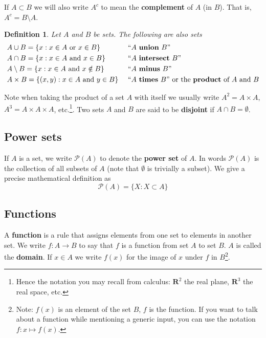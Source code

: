 \documentclass[12pt]{article}
\numberwithin{equation}{subsection}
\newtheorem{defn}[subsection]{Definition}
\theoremstyle{note}
\begin{document}
If $A\subset B$ we will also write $A^{c}$ to mean the \textbf{complement} of $A$ (in $B$). That is, $A^{c}=B\setminus A$.


\begin{defn}
Let $A$ and $B$ be sets. The following are also sets
\begin{align*}
	& A \cup B = \{ x : x\in A \text{ or } x\in B\} &&\text{ ``$A$ \textbf{union} $B$'' }\\
	& A \cap B = \{ x : x\in A \text{ and } x\in B\} &&\text{ ``$A$ \textbf{intersect} $B$'' }\\
	& A \setminus B = \{ x : x\in A \text{ and } x\notin B\}&& \text{ ``$A$ \textbf{minus} $B$'' }\\
	& A\times B = \{ (x,y) : x\in A \text{ and } y\in B\}&& \text{ ``$A$ \textbf{times} $B$'' or the \textbf{product} of $A$ and $B$} 
\end{align*}
\end{defn}

Note when taking the product of a set $A$ with itself we usually write $A^2=A\times A$, $A^3=A\times A\times A$, etc.\footnote{Hence the notation you may recall from calculus: $\mathbf{R}^2$ the real plane, $\mathbf{R}^3$ the real space, etc.}. Two sets $A$ and $B$ are said to be \textbf{disjoint} if $A \cap B = \emptyset$. 

 

\subsection{Power sets} If $A$ is a set, we write $\mathcal{P}(A)$ to denote the \textbf{power set} of $A$. In words $\mathcal{P}(A)$ is the collection of all subsets of $A$ (note that $\emptyset$ is trivially a subset). We give a precise mathematical definition as \begin{equation} \mathcal{P}(A)=\{ X : X\subset A\} \end{equation} 

\subsection{Functions} A \textbf{function} is a rule that assigns elements from one set to elements in another set. We write $f\colon A\to B$ to say that $f$ is a function from set $A$ to set $B$. $A$ is called the \textbf{domain}.  If $x\in A$ we write $f(x)$ for the image of $x$ under $f$ in $B$\footnote{Note: $f(x)$ is an element of the set $B$, $f$ is the function. If you want to talk about a function while mentioning a generic input, you can use the notation $f\colon x\mapsto f(x)$.}.
\end{document}
